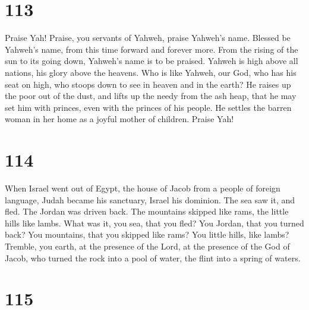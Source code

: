 \hypertarget{section-103}{%
\section{113}\label{section-103}}

 Praise Yah! Praise, you servants of Yahweh, praise Yahweh's
name.  Blessed be Yahweh's name, from this time forward and
forever more.  From the rising of the sun to its going down,
Yahweh's name is to be praised.  Yahweh is high above all
nations, his glory above the heavens.  Who is like Yahweh,
our God, who has his seat on high,  who stoops down to see
in heaven and in the earth?  He raises up the poor out of
the dust, and lifts up the needy from the ash heap,  that he
may set him with princes, even with the princes of his people.
 He settles the barren woman in her home as a joyful mother
of children. Praise Yah!

\hypertarget{section-104}{%
\section{114}\label{section-104}}

 When Israel went out of Egypt, the house of Jacob from a
people of foreign language,  Judah became his sanctuary,
Israel his dominion.  The sea saw it, and fled. The Jordan
was driven back.  The mountains skipped like rams, the
little hills like lambs.  What was it, you sea, that you
fled? You Jordan, that you turned back?  You mountains, that
you skipped like rams? You little hills, like lambs? 
Tremble, you earth, at the presence of the Lord, at the presence of the
God of Jacob,  who turned the rock into a pool of water, the
flint into a spring of waters.

\hypertarget{section-105}{%
\section{115}\label{section-105}}

